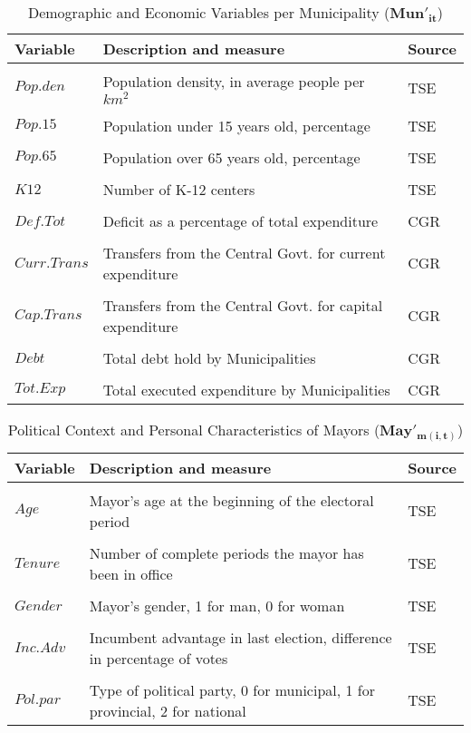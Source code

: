 \begin{table}[ht]
\caption{Demographic and Economic Variables per Municipality ($\mathbf{Mun'_{it}}$)}
\centering
\begin{tabular}{l l l}
\hline\hline
Variable & Description and measure & Source \\ [0.5ex] 
\hline
\\
$Pop.den$ & Population density, in average people per $km^2$ & TSE\\ 
\\
$Pop.15$ & Population under 15 years old, percentage & TSE \\
\\
$Pop.65$ & Population over 65 years old, percentage & TSE \\
\\
$K12$ & Number of K-12 centers & TSE \\
\\
$Def.Tot$ & Deficit as a percentage of total expenditure & CGR \\
\\
$Curr.Trans$ & Transfers from the Central Govt. for current expenditure & CGR \\
\\
$Cap.Trans$ & Transfers from the Central Govt. for capital expenditure & CGR \\
\\
$Debt$ & Total debt hold by Municipalities & CGR \\
\\
$Tot.Exp$ & Total executed expenditure by Municipalities & CGR \\
[1ex]
\hline
\end{tabular}
\label{table:nonlin}
\end{table}

\begin{table}[ht]
\caption{Political Context and Personal Characteristics of Mayors ($\mathbf{May'_{m(i,t)}}$)}
\centering
\begin{tabular}{l l l}
\hline\hline
Variable & Description and measure & Source \\ [0.5ex] 
\hline
\\
$Age$ & Mayor's age at the beginning of the electoral period  & TSE\\
\\
$Tenure$ & Number of complete periods the mayor has been in office  & TSE\\
\\
$Gender$ & Mayor's gender, 1 for man, 0 for woman  & TSE\\
\\
$Inc.Adv$ & Incumbent advantage in last election, difference in percentage of votes & TSE\\
\\
$Pol.par$ & Type of political party, 0 for municipal, 1 for provincial, 2 for national & TSE\\
[1ex]
\hline
\end{tabular}
\label{table:nonlin}
\end{table}

